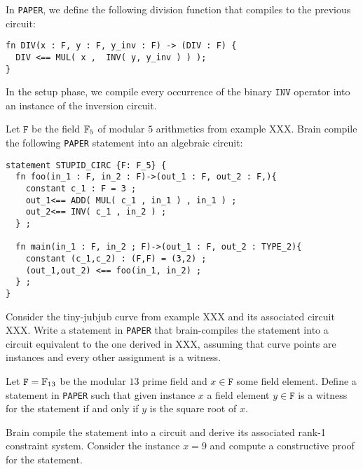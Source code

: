 In \texttt{PAPER}, we define the following division function that compiles to the previous circuit:
\begin{lstlisting}
fn DIV(x : F, y : F, y_inv : F) -> (DIV : F) {
  DIV <== MUL( x ,  INV( y, y_inv ) ) );
}
\end{lstlisting}
In the setup phase, we compile every occurrence of the binary $\mathtt{INV}$ operator into an instance of the inversion circuit.
\begin{exercise} Let $\mathtt{F}$ be the field $\mathbb{F}_5$ of modular $5$ arithmetics from example XXX. Brain compile the following \texttt{PAPER} statement into an algebraic circuit:
\begin{lstlisting}
statement STUPID_CIRC {F: F_5} {
  fn foo(in_1 : F, in_2 : F)->(out_1 : F, out_2 : F,){
    constant c_1 : F = 3 ;
    out_1<== ADD( MUL( c_1 , in_1 ) , in_1 ) ;
    out_2<== INV( c_1 , in_2 ) ;
  } ;
    
  fn main(in_1 : F, in_2 ; F)->(out_1 : F, out_2 : TYPE_2){
	constant (c_1,c_2) : (F,F) = (3,2) ;
    (out_1,out_2) <== foo(in_1, in_2) ;
  } ;
}
\end{lstlisting}
\end{exercise}
\begin{exercise} Consider the tiny-jubjub curve from example XXX and its associated circuit XXX. Write a statement in \texttt{PAPER} that brain-compiles the statement into a circuit equivalent to the one derived in XXX, assuming that curve points are instances and every other assignment is a witness. 
\end{exercise}
\begin{exercise} Let $\mathtt{F}=\mathbb{F}_{13}$ be the modular $13$ prime field and $x\in\mathtt{F}$ some field element. Define a statement in \texttt{PAPER} such that given instance $x$ a field element $y\in\mathtt{F}$ is a witness for the statement if and only if $y$ is the square root of $x$.  

Brain compile the statement into a circuit and derive its associated rank-1 constraint system. Consider the instance $x=9$ and compute a constructive proof for the statement. 
\begin{comment}
statement KNOWLEDGE_OF_SQUARE_ROOT {F} {
  fn SQUARE(x : F)->(xx : F){
    xx<== MUL( x , x ) ;
  } ;
    
  fn main(pub x : F, y : F )->(){
    constant c_1 : F = 0 ;
    c_1 <==  SUB( x , SQUARE( y , y ) );
  } ;
}
\end{lstlisting}
\end{comment}
\end{exercise}
